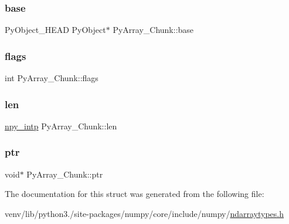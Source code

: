 \subsubsection{\texorpdfstring{base}{base}}
{\footnotesize\ttfamily Py\+Object\+\_\+\+H\+E\+AD Py\+Object$\ast$ Py\+Array\+\_\+\+Chunk\+::base}

\mbox{\label{structPyArray__Chunk_a4dac1d595913af0e2193bf1e93e960cb}} 
\subsubsection{\texorpdfstring{flags}{flags}}
{\footnotesize\ttfamily int Py\+Array\+\_\+\+Chunk\+::flags}

\mbox{\label{structPyArray__Chunk_abb6db82c88df0ddfcdbd2d947833e7ec}} 
\subsubsection{\texorpdfstring{len}{len}}
{\footnotesize\ttfamily \hyperlink{npy__common_8h_a2d6effc4d5ecb85675ebfcfaa102b483}{npy\+\_\+intp} Py\+Array\+\_\+\+Chunk\+::len}

\mbox{\label{structPyArray__Chunk_a55119957f0529399a8c61ac19b500769}} 
\subsubsection{\texorpdfstring{ptr}{ptr}}
{\footnotesize\ttfamily void$\ast$ Py\+Array\+\_\+\+Chunk\+::ptr}



The documentation for this struct was generated from the following file\+:\begin{DoxyCompactItemize}
\item 
venv/lib/python3./site-\/packages/numpy/core/include/numpy/\hyperlink{ndarraytypes_8h}{ndarraytypes.\+h}\end{DoxyCompactItemize}
